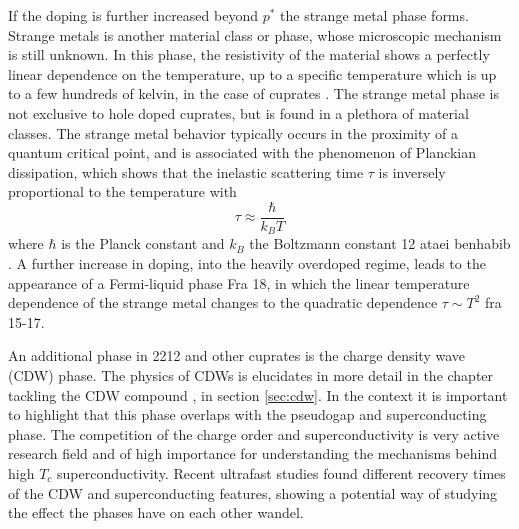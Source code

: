 If the doping is further increased beyond $p^*$ the strange metal phase forms.
Strange metals is another material class or phase, whose microscopic mechanism is still unknown.
In this phase, the resistivity of the material shows a perfectly linear dependence on the temperature, up to a specific temperature which is up to a few hundreds of kelvin, in the case of cuprates \cite{}.
The strange metal phase is not exclusive to hole doped cuprates, but is found in a plethora of material classes.
The strange metal behavior typically occurs in the proximity of a quantum critical point, and is associated with the phenomenon of Planckian dissipation, which shows that the inelastic scattering time $\tau$ is inversely proportional to the temperature with
\begin{equation}
	\tau \approx \frac{\hbar}{k_BT}
\end{equation}
where $\hbar$ is the Planck constant and $k_B$ the Boltzmann constant \cite{} 12 ataei benhabib .
A further increase in doping, into the heavily overdoped regime, leads to the appearance of a Fermi-liquid phase \cite{} Fra 18, in which the linear temperature dependence of the strange metal changes to the quadratic dependence $\tau\sim T^2$ \cite{} fra 15-17.

An additional phase in 2212 and other cuprates is the charge density wave (CDW) phase.
The physics of CDWs is elucidates in more detail in the chapter tackling the CDW compound , in section \ref{sec:cdw}.
In the context it is important to highlight that this phase overlaps with the pseudogap and superconducting phase.
The competition of the charge order and superconductivity is very active research field and of high importance for understanding the mechanisms behind high $T_c$ superconductivity.
Recent ultrafast studies found different recovery times of the CDW and superconducting features, showing a potential way of studying the effect the phases have on each other \cite{} wandel.

